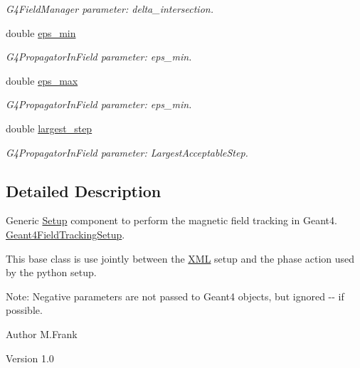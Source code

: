 \begin{DoxyCompactItemize}
\begin{DoxyCompactList}\small\item\em G4FieldManager parameter: delta\_\-intersection. \item\end{DoxyCompactList}\item 
double \hyperlink{struct_d_d4hep_1_1_simulation_1_1_geant4_field_tracking_setup_afc80b1b5d836629561e474b3f2e501e5}{eps\_\-min}
\begin{DoxyCompactList}\small\item\em G4PropagatorInField parameter: eps\_\-min. \item\end{DoxyCompactList}\item 
double \hyperlink{struct_d_d4hep_1_1_simulation_1_1_geant4_field_tracking_setup_a1402c7ed2e3696d92cd8a97b48d175bf}{eps\_\-max}
\begin{DoxyCompactList}\small\item\em G4PropagatorInField parameter: eps\_\-min. \item\end{DoxyCompactList}\item 
double \hyperlink{struct_d_d4hep_1_1_simulation_1_1_geant4_field_tracking_setup_a24ad8216cbc0b9c7991c9818a527fb76}{largest\_\-step}
\begin{DoxyCompactList}\small\item\em G4PropagatorInField parameter: LargestAcceptableStep. \item\end{DoxyCompactList}\end{DoxyCompactItemize}


\subsection{Detailed Description}
Generic \hyperlink{namespace_d_d4hep_1_1_simulation_1_1_setup}{Setup} component to perform the magnetic field tracking in Geant4. \hyperlink{struct_d_d4hep_1_1_simulation_1_1_geant4_field_tracking_setup}{Geant4FieldTrackingSetup}.

This base class is use jointly between the \hyperlink{namespace_d_d4hep_1_1_x_m_l}{XML} setup and the phase action used by the python setup.

Note: Negative parameters are not passed to Geant4 objects, but ignored -\/-\/ if possible.

\begin{DoxyAuthor}{Author}
M.Frank 
\end{DoxyAuthor}
\begin{DoxyVersion}{Version}
1.0 
\end{DoxyVersion}


